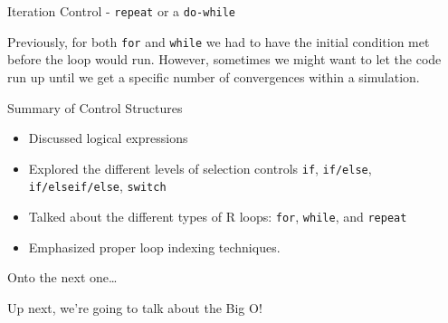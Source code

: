 \begin{frame}[fragile]{Iteration Control - \texttt{repeat} or a
\texttt{do-while}}

Previously, for both \texttt{for} and \texttt{while} we had to have the
initial condition met before the loop would run. However, sometimes we
might want to let the code run up until we get a specific number of
convergences within a simulation.

\begin{Shaded}
\begin{Highlighting}[]
\StringTok{ }
\StringTok{ }
\StringTok{ }
  
  \NormalTok{(}\NormalTok{) >}\StringTok{ }\NormalTok{)\{}
    \StringTok{ }\StringTok{ }  
  \NormalTok{\}}
  
  \StringTok{ }\StringTok{ }
  
  \StringTok{ }
  \NormalTok{\}}
\NormalTok{\}}
\end{Highlighting}
\end{Shaded}

\end{frame}

\begin{frame}[fragile]{Summary of Control Structures}

\begin{itemize}
\tightlist
\item
  Discussed logical expressions
\item
  Explored the different levels of selection controls \texttt{if},
  \texttt{if/else}, \texttt{if/elseif/else}, \texttt{switch}
\item
  Talked about the different types of R loops: \texttt{for},
  \texttt{while}, and \texttt{repeat}
\item
  Emphasized proper loop indexing techniques.
\end{itemize}

\end{frame}

\begin{frame}{Onto the next one\ldots{}}

Up next, we're going to talk about the Big O!

\end{frame}

